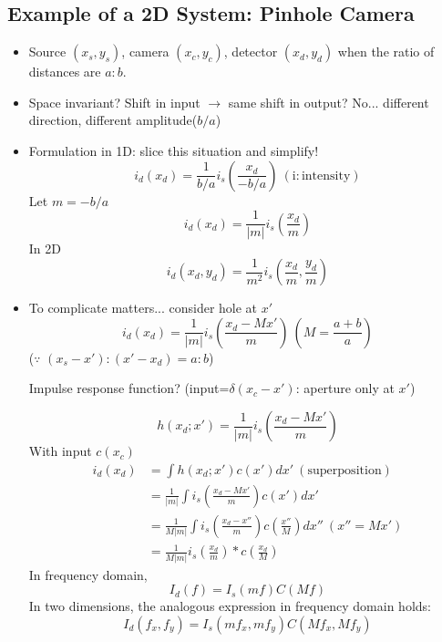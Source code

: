 \documentclass{article}
\begin{document}
\subsection{Example of a 2D System: Pinhole Camera}
\begin{itemize}
    \item Source $(x_s,y_s)$, camera $(x_c,y_c)$, detector $(x_d,y_d)$ when the ratio of distances are $a:b$.
    \item Space invariant? Shift in input $\rightarrow$ same shift in output? No... different direction, different amplitude($b/a$)
    \item Formulation in 1D: slice this situation and simplify!
    \[
    i_d(x_d)=\frac{1}{b/a}i_s\left(\frac{x_d}{-b/a}\right)\:(\mathrm{i:intensity})
    \]
    Let $m=-b/a$
    \[
    i_d(x_d)=\frac{1}{|m|}i_s\left(\frac{x_d}{m}\right)
    \]
    In 2D
    \[
    i_d(x_d,y_d)=\frac{1}{m^2}i_s\left(\frac{x_d}{m},\frac{y_d}{m}\right)
    \]
    \item To complicate matters... consider hole at $x'$
    \[
    i_d(x_d)=\frac{1}{|m|}i_s\left(\frac{x_d-Mx'}{m}\right)\:(M=\frac{a+b}{a})
    \]
    ($\because$ $(x_s-x'):(x'-x_d)=a:b$)
    
    Impulse response function? (input=$\delta(x_c-x')$: aperture only at $x'$)
    
    \[h(x_d;x')=\frac{1}{|m|}i_s\left(\frac{x_d-Mx'}{m}\right)\]
    With input $c(x_c)$
    \begin{align*}
    i_d(x_d)&=\int{h(x_d;x')c(x')dx'}\:(\mathrm{superposition})\\
    &=\frac{1}{|m|}\int{i_s\left(\frac{x_d-Mx'}{m}\right)c(x')dx'}\\
    &=\frac{1}{M|m|}\int{i_s\left(\frac{x_d-x''}{m}\right)c\left(\frac{x''}{M}
    \right)dx''}\:(x''=Mx')\\
    &=\frac{1}{M|m|}i_s\left(\frac{x_d}{m}\right)*c\left(\frac{x_d}{M}
    \right)
    \end{align*}
    In frequency domain,
    \[
    I_d(f)=I_s(mf)C(Mf)
    \]
    In two dimensions, the analogous expression in frequency domain holds:
    \[
    I_d(f_x,f_y)=I_s(mf_x,mf_y)C(Mf_x,Mf_y)
    \]
\end{itemize}
\end{document}
